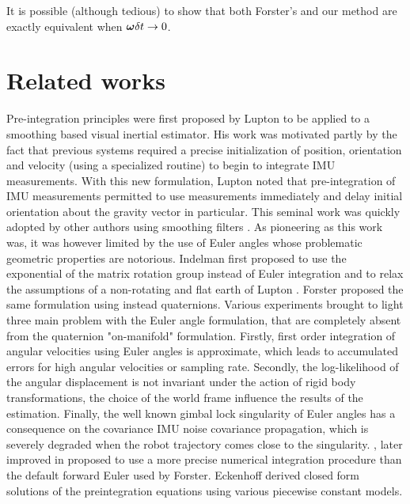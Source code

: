 It is possible (although tedious) to show that both Forster's and our method are exactly equivalent when ${{\bm \omega}}\delta t\to0$.




\section{Related works}

Pre-integration principles were first proposed by Lupton \cite{lupton-09} to be applied to a smoothing based visual inertial estimator. His work was motivated partly 
by the fact that previous systems required a precise initialization of position, orientation and velocity (using a specialized routine) to begin to integrate IMU measurements. 
With this new formulation, Lupton noted that pre-integration of IMU measurements permitted to use measurements immediately and delay initial orientation about the gravity
vector in particular. 
This seminal work was quickly adopted by other authors using smoothing filters \cite{carlone2014eliminating}. As pioneering as this work was, it was however 
limited by the use of Euler angles whose problematic geometric properties are notorious. Indelman \cite{Indelman-2013-7768} first proposed to use the exponential of the 
matrix rotation group instead of Euler integration and to relax the assumptions of a non-rotating and flat earth of Lupton \cite{lupton-09}. Forster \cite{forster2015imu, forster2017-TRO}
proposed the same formulation using instead quaternions. Various experiments brought to light three main problem with the Euler angle formulation, that are completely absent 
from the quaternion "on-manifold" formulation. Firstly, first order integration of angular velocities using Euler angles is approximate, which leads to accumulated errors 
for high angular velocities or sampling rate.  Secondly, the log-likelihood of the angular displacement is not invariant under the action of rigid body transformations, 
\eg the choice of the world frame influence the results of the estimation. Finally, the well known gimbal lock singularity of Euler angles has a consequence 
on the covariance IMU noise covariance propagation, which is severely degraded when the robot trajectory comes close to the singularity. 
\cite{shen2015tightly}, later improved in \cite{qin2018vins} proposed to use a more precise numerical integration procedure than the default forward Euler used by Forster. 
Eckenhoff \cite{eckenhoff2019closed} derived closed form solutions of the preintegration equations using various piecewise constant models.

